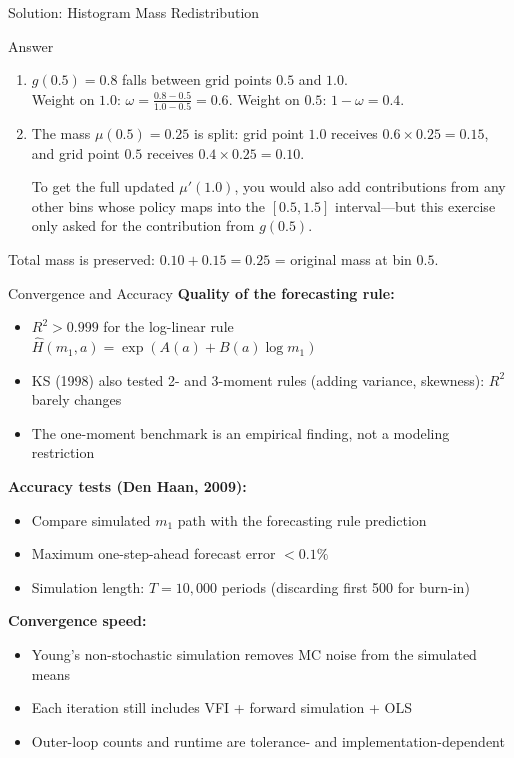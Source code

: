 \documentclass[aspectratio=169,11pt]{beamer}
\newcommand{\emphc}[1]{\textcolor{harvardcrimson}{#1}}
\begin{document}
\begin{frame}{Solution: Histogram Mass Redistribution}
\begin{block}{Answer}
\begin{enumerate}
    \item $g(0.5) = 0.8$ falls between grid points $0.5$ and $1.0$.\\
    Weight on $1.0$: $\omega = \frac{0.8 - 0.5}{1.0 - 0.5} = 0.6$. \quad Weight on $0.5$: $1 - \omega = 0.4$.
    \item The mass $\mu(0.5) = 0.25$ is split: grid point $1.0$ receives $0.6 \times 0.25 = 0.15$, and grid point $0.5$ receives $0.4 \times 0.25 = 0.10$.

    To get the full updated $\mu'(1.0)$, you would also add contributions from any other bins whose policy maps into the $[0.5, 1.5]$ interval---but this exercise only asked for the contribution from $g(0.5)$.
\end{enumerate}
Total mass is preserved: $0.10 + 0.15 = 0.25$ = original mass at bin $0.5$. \checkmark
\end{block}
\end{frame}

\begin{frame}{Convergence and Accuracy}
\textbf{Quality of the forecasting rule:}
\begin{itemize}
    \item $R^2 > 0.999$ for the log-linear rule $\hat{H}(m_1, a) = \exp(A(a) + B(a) \log m_1)$
    \item KS (1998) also tested 2- and 3-moment rules (adding variance, skewness): $R^2$ barely changes
    \item The one-moment benchmark is an \emphc{empirical finding}, not a modeling restriction
\end{itemize}

\vspace{0.5em}
\textbf{Accuracy tests (Den Haan, 2009):}
\begin{itemize}
    \item Compare simulated $m_1$ path with the forecasting rule prediction
    \item Maximum one-step-ahead forecast error $< 0.1\%$
    \item Simulation length: $T = 10{,}000$ periods (discarding first 500 for burn-in)
\end{itemize}

\vspace{0.5em}
\textbf{Convergence speed:}
\begin{itemize}
    \item Young's non-stochastic simulation removes MC noise from the simulated means
    \item Each iteration still includes VFI + forward simulation + OLS
    \item Outer-loop counts and runtime are tolerance- and implementation-dependent
\end{itemize}
\end{frame}
\end{document}
